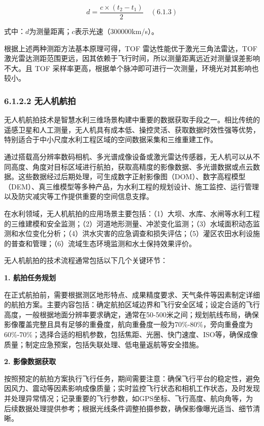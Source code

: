 \[d = \frac{c \times (t_2 - t_1)}{2} \quad (6.1.3)\]

式中：\(d\)为测量距离；\(c\)表示光速（300000km/s）。

根据上述两种测距方法基本原理可得，TOF
雷达性能优于激光三角法雷达，TOF激光雷达测距范围更远，因其依赖于飞行时间，所以测量距离远近对测量误差影响不大。且
TOF 采样率更高，根据单个脉冲即可进行一次测量，环境光对其影响也较小。

\subsubsection{6.1.2.2 无人机航拍}\label{ux65e0ux4ebaux673aux822aux62cd}

无人机航拍技术是智慧水利三维场景构建中重要的数据获取手段之一。相比传统的遥感卫星和人工测量，无人机具有成本低、操控灵活、获取数据时效性强等优势，特别适合于中小尺度水利工程区域的空间数据采集和三维重建工作。

通过搭载高分辨率数码相机、多光谱成像设备或激光雷达传感器，无人机可以从不同高度、角度对目标区域进行航拍，获取高精度的影像数据、多光谱数据或点云数据。这些数据经过后期处理，可生成数字正射影像图（DOM）、数字高程模型（DEM）、真三维模型等多种产品，为水利工程的规划设计、施工监控、运行管理以及防灾减灾等工作提供重要的空间信息支撑。

在水利领域，无人机航拍的应用场景主要包括：（1）大坝、水库、水闸等水利工程的三维建模和安全监测；（2）河道地形测量、冲淤变化监测；（3）水域面积动态监测和水位变化分析；（4）洪水灾害的应急调查和损失评估；（5）灌区农田水利设施的普查和管理；（6）流域生态环境监测和水土保持效果评价。

无人机航拍的技术流程通常包括以下几个关键环节：

\textbf{1. 航拍任务规划}

在正式航拍前，需要根据测区地形特点、成果精度要求、天气条件等因素制定详细的航拍方案。主要内容包括：确定航拍区域边界和飞行安全区域；设定合适的飞行高度，一般根据地面分辨率要求确定，通常在50-500米之间；规划航线布局，确保影像覆盖完整且具有足够的重叠度，航向重叠度一般为70\%-80\%，旁向重叠度为60\%-70\%；选择合适的相机参数，包括焦距、光圈、快门速度、ISO等，确保成像质量；制定应急预案，包括失联处理、低电量返航等安全措施。

\textbf{2. 影像数据获取}

按照预定的航拍方案执行飞行任务，期间需要注意：确保飞行平台的稳定性，避免因风力、震动等因素影响成像质量；实时监控飞行状态和相机工作状态，及时发现并处理异常情况；记录重要的飞行参数，如GPS坐标、飞行高度、航向角等，为后续数据处理提供参考；根据光线条件调整拍摄参数，确保影像曝光适当、细节清晰。

